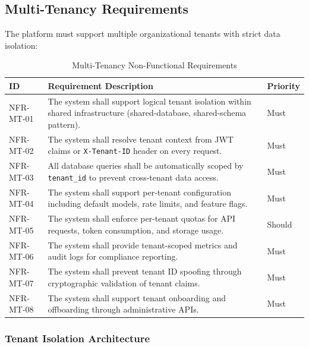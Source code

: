 \subsection{Multi-Tenancy Requirements}
\label{subsec:nfr-multitenancy}

The platform must support multiple organizational tenants with strict data isolation:

\begin{table}[htbp]
\centering
\caption{Multi-Tenancy Non-Functional Requirements}
\label{tab:nfr-multitenancy}
\small
\begin{tabularx}{\textwidth}{|l|X|l|}
\hline
\textbf{ID} & \textbf{Requirement Description} & \textbf{Priority} \\
\hline
NFR-MT-01 & The system shall support logical tenant isolation within shared infrastructure (shared-database, shared-schema pattern). & Must \\
\hline
NFR-MT-02 & The system shall resolve tenant context from JWT claims or \texttt{X-Tenant-ID} header on every request. & Must \\
\hline
NFR-MT-03 & All database queries shall be automatically scoped by \texttt{tenant\_id} to prevent cross-tenant data access. & Must \\
\hline
NFR-MT-04 & The system shall support per-tenant configuration including default models, rate limits, and feature flags. & Must \\
\hline
NFR-MT-05 & The system shall enforce per-tenant quotas for API requests, token consumption, and storage usage. & Should \\
\hline
NFR-MT-06 & The system shall provide tenant-scoped metrics and audit logs for compliance reporting. & Must \\
\hline
NFR-MT-07 & The system shall prevent tenant ID spoofing through cryptographic validation of tenant claims. & Must \\
\hline
NFR-MT-08 & The system shall support tenant onboarding and offboarding through administrative APIs. & Must \\
\hline
\end{tabularx}
\end{table}

\subsubsection{Tenant Isolation Architecture}

